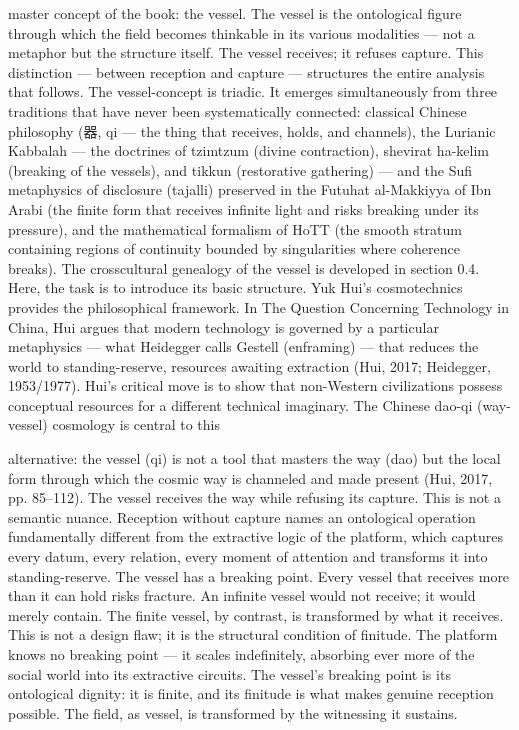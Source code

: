 master concept of the book: the vessel. The vessel is the ontological figure through which the field becomes thinkable in its various modalities — not a metaphor but the structure itself. The vessel receives; it refuses capture. This distinction — between reception and capture — structures the entire analysis that follows. The vessel-concept is triadic. It emerges simultaneously from three traditions that have never been systematically connected: classical Chinese philosophy (器, qi — the thing that receives, holds, and channels), the Lurianic Kabbalah — the doctrines of tzimtzum (divine contraction), shevirat ha-kelim (breaking of the vessels), and tikkun (restorative gathering) — and the Sufi metaphysics of disclosure (tajalli) preserved in the Futuhat al-Makkiyya of Ibn Arabi (the finite form that receives infinite light and risks breaking under its pressure), and the mathematical formalism of HoTT (the smooth stratum containing regions of continuity bounded by singularities where coherence breaks). The crosscultural genealogy of the vessel is developed in section 0.4. Here, the task is to introduce its basic structure. Yuk Hui’s cosmotechnics provides the philosophical framework. In The Question Concerning Technology in China, Hui argues that modern technology is governed by a particular metaphysics — what Heidegger calls Gestell (enframing) — that reduces the world to standing-reserve, resources awaiting extraction (Hui, 2017; Heidegger, 1953/1977). Hui’s critical move is to show that non-Western civilizations possess conceptual resources for a different technical imaginary. The Chinese dao-qi (way-vessel) cosmology is central to this

alternative: the vessel (qi) is not a tool that masters the way (dao) but the local form through which the cosmic way is channeled and made present (Hui, 2017, pp. 85–112). The vessel receives the way while refusing its capture. This is not a semantic nuance. Reception without capture names an ontological operation fundamentally different from the extractive logic of the platform, which captures every datum, every relation, every moment of attention and transforms it into standing-reserve. The vessel has a breaking point. Every vessel that receives more than it can hold risks fracture. An infinite vessel would not receive; it would merely contain. The finite vessel, by contrast, is transformed by what it receives. This is not a design flaw; it is the structural condition of finitude. The platform knows no breaking point — it scales indefinitely, absorbing ever more of the social world into its extractive circuits. The vessel’s breaking point is its ontological dignity: it is finite, and its finitude is what makes genuine reception possible. The field, as vessel, is transformed by the witnessing it sustains.

